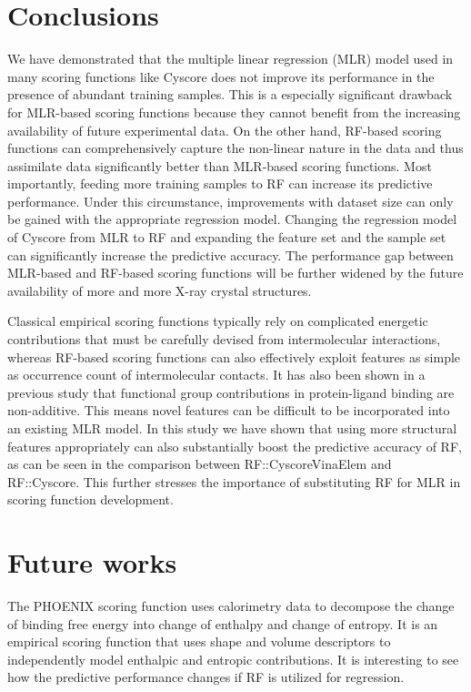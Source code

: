 \section{Conclusions}

We have demonstrated that the multiple linear regression (MLR) model used in many scoring functions like Cyscore does not improve its performance in the presence of abundant training samples. This is a especially significant drawback for MLR-based scoring functions because they cannot benefit from the increasing availability of future experimental data. On the other hand, RF-based scoring functions can comprehensively capture the non-linear nature in the data and thus assimilate data significantly better than MLR-based scoring functions. Most importantly, feeding more training samples to RF can increase its predictive performance. Under this circumstance, improvements with dataset size can only be gained with the appropriate regression model. Changing the regression model of Cyscore from MLR to RF and expanding the feature set and the sample set can significantly increase the predictive accuracy. The performance gap between MLR-based and RF-based scoring functions will be further widened by the future availability of more and more X-ray crystal structures.

Classical empirical scoring functions typically rely on complicated energetic contributions that must be carefully devised from intermolecular interactions, whereas RF-based scoring functions can also effectively exploit features as simple as occurrence count of intermolecular contacts. It has also been shown in a previous study that functional group contributions in protein-ligand binding are non-additive. This means novel features can be difficult to be incorporated into an existing MLR model. In this study we have shown that using more structural features appropriately can also substantially boost the predictive accuracy of RF, as can be seen in the comparison between RF::CyscoreVinaElem and RF::Cyscore. This further stresses the importance of substituting RF for MLR in scoring function development.

\section{Future works}

The PHOENIX \citep{576} scoring function uses calorimetry data to decompose the change of binding free energy into change of enthalpy and change of entropy. It is an empirical scoring function that uses shape and volume descriptors to independently model enthalpic and entropic contributions. It is interesting to see how the predictive performance changes if RF is utilized for regression.

\chapterend

